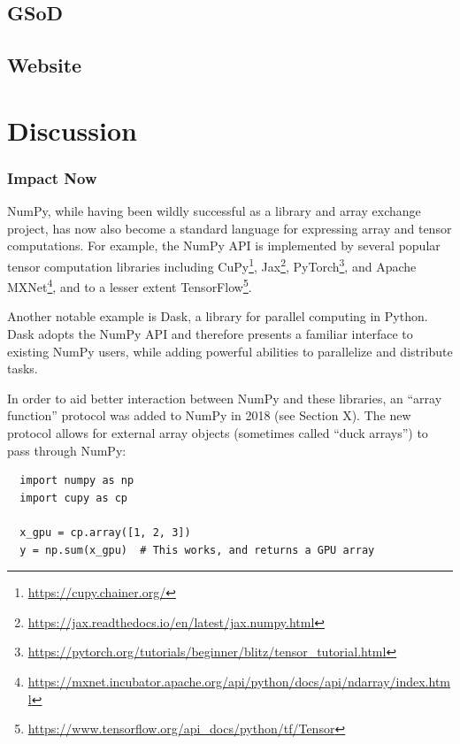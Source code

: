 \documentclass[fleqn,10pt]{wlscirep}
\begin{document}

\subsection*{GSoD}

\subsection*{Website}

\section*{Discussion}

\subsubsection*{Impact Now}

NumPy, while having been wildly successful as a library and array
exchange project, has now also become a standard language for expressing array
and tensor computations.  For example, the NumPy API is implemented by
several popular tensor computation libraries including
CuPy\footnote{\url{https://cupy.chainer.org/}},
Jax\footnote{\url{https://jax.readthedocs.io/en/latest/jax.numpy.html}},
PyTorch\footnote{\url{https://pytorch.org/tutorials/beginner/blitz/tensor\_tutorial.html}}, and
Apache MXNet\footnote{\url{https://mxnet.incubator.apache.org/api/python/docs/api/ndarray/index.html}},
and to a lesser extent
TensorFlow\footnote{\url{https://www.tensorflow.org/api\_docs/python/tf/Tensor}}.

Another notable example is Dask, a library for parallel computing in
Python.  Dask adopts the NumPy API and therefore presents a familiar
interface to existing NumPy users, while adding powerful abilities to
parallelize and distribute tasks.

In order to aid better interaction between NumPy and these libraries,
an ``array function'' protocol was added to NumPy in 2018 (see Section
X). The new protocol allows for external array objects (sometimes
called ``duck arrays'') to pass through NumPy:

\begin{lstlisting}
  import numpy as np
  import cupy as cp

  x_gpu = cp.array([1, 2, 3])
  y = np.sum(x_gpu)  # This works, and returns a GPU array
\end{lstlisting}
\end{document}

